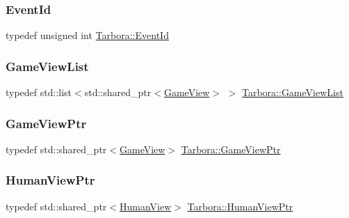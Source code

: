 \subsubsection{\texorpdfstring{Event\+Id}{EventId}}
{\footnotesize\ttfamily typedef unsigned int \hyperlink{namespaceTarbora_a5373bb1f8a65622379828cdefc8d42e5}{Tarbora\+::\+Event\+Id}}

\mbox{\label{namespaceTarbora_a56e11e2432d7da50caa0fb6a1633a3ad}} 
\subsubsection{\texorpdfstring{Game\+View\+List}{GameViewList}}
{\footnotesize\ttfamily typedef std\+::list$<$std\+::shared\+\_\+ptr$<$\hyperlink{classTarbora_1_1GameView}{Game\+View}$>$ $>$ \hyperlink{namespaceTarbora_a56e11e2432d7da50caa0fb6a1633a3ad}{Tarbora\+::\+Game\+View\+List}}

\mbox{\label{namespaceTarbora_a4267051f12bbb76c4730610ab987d0bf}} 
\subsubsection{\texorpdfstring{Game\+View\+Ptr}{GameViewPtr}}
{\footnotesize\ttfamily typedef std\+::shared\+\_\+ptr$<$\hyperlink{classTarbora_1_1GameView}{Game\+View}$>$ \hyperlink{namespaceTarbora_a4267051f12bbb76c4730610ab987d0bf}{Tarbora\+::\+Game\+View\+Ptr}}

\mbox{\label{namespaceTarbora_ae1b20477ea6a4f1774565201d193e0c1}} 
\subsubsection{\texorpdfstring{Human\+View\+Ptr}{HumanViewPtr}}
{\footnotesize\ttfamily typedef std\+::shared\+\_\+ptr$<$\hyperlink{classTarbora_1_1HumanView}{Human\+View}$>$ \hyperlink{namespaceTarbora_ae1b20477ea6a4f1774565201d193e0c1}{Tarbora\+::\+Human\+View\+Ptr}}

\mbox{\label{namespaceTarbora_aee2ef7c48625ede704b0513d7fe097e3}} 
